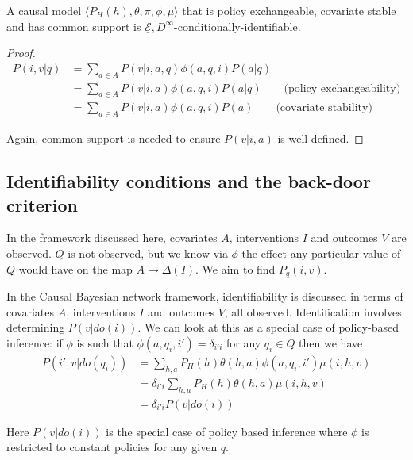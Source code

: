 \begin{theorem}
A causal model $\langle P_H(h),\theta,\pi,\phi,\mu \rangle$ that is policy exchangeable, covariate stable and has common support is $\underline{\mathscr{E}}, D^\infty$-conditionally-identifiable.
\end{theorem}

\begin{proof}
\begin{align}
    P(i,v|q) &= \sum_{a\in A} P(v|i,a,q) \phi(a,q,i) P(a|q) \\
             &= \sum_{a\in A} P(v|i,a) \phi(a,q,i) P(a|q) \qquad\text{(policy exchangeability)}\\
             &= \sum_{a\in A} P(v|i,a) \phi(a,q,i) P(a) \qquad \text{(covariate stability)}
\end{align}

Again, common support is needed to ensure $P(v|i,a)$ is well defined.    

\end{proof}

\subsection{Identifiability conditions and the back-door criterion}

In the framework discussed here, covariates $A$, interventions $I$ and outcomes $V$ are observed. $Q$ is not observed, but we know via $\phi$ the effect any particular value of $Q$ would have on the map $A\to\Delta(I)$. We aim to find $P_q(i,v)$.

In the Causal Bayesian network framework, identifiability is discussed in terms of covariates $A$, interventions $I$ and outcomes $V$, all observed. Identification involves determining $P(v|do(i))$. We can look at this as a special case of policy-based inference: if $\phi$ is such that $\phi(a,q_i,i')=\delta_{i'i}$ for any $q_i\in Q$ then we have
\begin{align}
    P(i',v|do(q_i)) &= \sum_{h,a} P_H(h) \theta(h,a) \phi(a,q_i,i') \mu(i,h,v) \\
                    &= \delta_{i'i} \sum_{h,a} P_H(h) \theta(h,a) \mu(i,h,v) \\
                    &= \delta_{i'i} P(v|do(i))
\end{align}

Here $P(v|do(i))$ is the special case of policy based inference where $\phi$ is restricted to constant policies for any given $q$.

